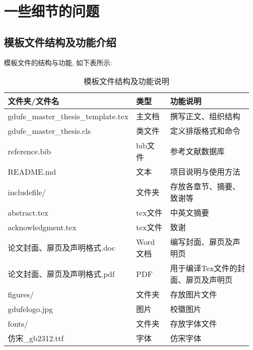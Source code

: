 \chapter{一些细节的问题 \the\baselineskip}
\the\baselineskip
\section{模板文件结构及功能介绍 \the\baselineskip}

模板文件的结构与功能, 如下表所示: \the\baselineskip
\begin{table}[ht]\centering
  \begin{tabular}{lll}
    \toprule
    文件夹/文件名                             & 类型     & 功能说明                \\
    \midrule
    gdufe\_master\_thesis\_template.tex & 主文档    & 撰写正文、组织结构           \\
    gdufe\_master\_thesis.cls           & 类文件    & 定义排版格式和命令           \\
    reference.bib                       & bib文件  & 参考文献数据库             \\
    README.md                           & 文本     & 项目说明与使用方法           \\
    includefile/                        & 文件夹    & 存放各章节、摘要、致谢等        \\
    \quad abstract.tex                  & tex文件  & 中英文摘要               \\
    \quad acknowledgment.tex            & tex文件  & 致谢                  \\
    \quad 论文封面、扉页及声明格式.doc              & Word文档 & 编写封面、扉页及声明页         \\
    \quad 论文封面、扉页及声明格式.pdf              & PDF    & 用于编译Tex文件的封面、扉页及声明页 \\
    figures/                            & 文件夹    & 存放图片文件              \\
    \quad gdufelogo.jpg                 & 图片     & 校徽图片                \\
    fonts/                              & 文件夹    & 存放字体文件              \\
    \quad 仿宋\_gb2312.ttf                & 字体     & 仿宋字体                \\
    \bottomrule
  \end{tabular}
  \caption{模板文件结构及功能说明}
\end{table}


